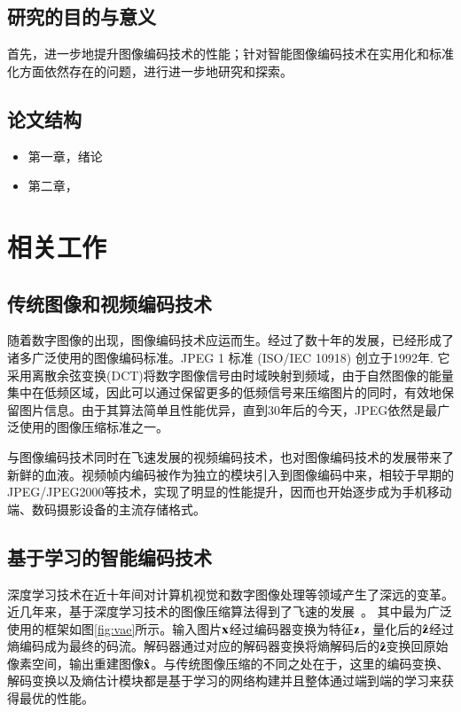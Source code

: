 \documentclass[macfonts,phd,oneside,nobackinfo]{njuthesis}
\begin{document}
\section{研究的目的与意义}
首先，进一步地提升图像编码技术的性能；针对智能图像编码技术在实用化和标准化方面依然存在的问题，进行进一步地研究和探索。




\section{论文结构}

\begin{itemize}
\item 第一章，绪论
\item 第二章，

\end{itemize}



\chapter{相关工作}
\section{传统图像和视频编码技术}
随着数字图像的出现，图像编码技术应运而生。经过了数十年的发展，已经形成了诸多广泛使用的图像编码标准。JPEG 1 标准 (ISO/IEC 10918) 创立于1992年. 它采用离散余弦变换(DCT)将数字图像信号由时域映射到频域，由于自然图像的能量集中在低频区域，因此可以通过保留更多的低频信号来压缩图片的同时，有效地保留图片信息。由于其算法简单且性能优异，直到30年后的今天，JPEG依然是最广泛使用的图像压缩标准之一。

与图像编码技术同时在飞速发展的视频编码技术，也对图像编码技术的发展带来了新鲜的血液。视频帧内编码被作为独立的模块引入到图像编码中来，相较于早期的JPEG/JPEG2000等技术，实现了明显的性能提升，因而也开始逐步成为手机移动端、数码摄影设备的主流存储格式。

\section{基于学习的智能编码技术}
深度学习技术在近十年间对计算机视觉和数字图像处理等领域产生了深远的变革。近几年来，基于深度学习技术的图像压缩算法得到了飞速的发展~\cite{balle2016end, balle2018variational, minnen2018joint}。
其中最为广泛使用的框架如图\ref{fig:vae}所示。输入图片$\bf x$经过编码器变换为特征$\bf z$，量化后的$\bf \hat{z}$经过熵编码成为最终的码流。解码器通过对应的解码器变换将熵解码后的$\bf \hat{z}$变换回原始像素空间，输出重建图像$\bf \hat{x}$。与传统图像压缩的不同之处在于，这里的编码变换、解码变换以及熵估计模块都是基于学习的网络构建并且整体通过端到端的学习来获得最优的性能。
\end{document}
